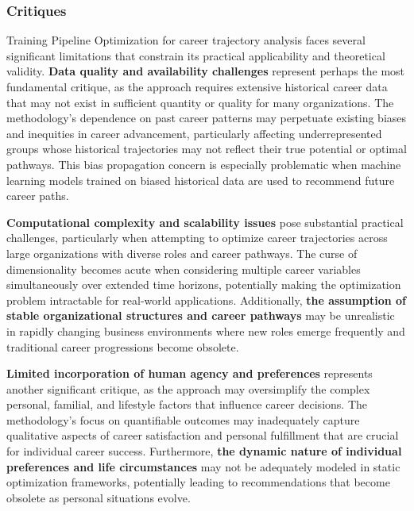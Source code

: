 \documentclass[main.tex]{subfiles}
\begin{document}
\subsubsection{Critiques}

Training Pipeline Optimization for career trajectory analysis faces several significant limitations that constrain its practical applicability and theoretical validity\parencite{career_optimization}. \textbf{Data quality and availability challenges} represent perhaps the most fundamental critique, as the approach requires extensive historical career data that may not exist in sufficient quantity or quality for many organizations\parencite{career_optimization}. The methodology's dependence on past career patterns may perpetuate existing biases and inequities in career advancement, particularly affecting underrepresented groups whose historical trajectories may not reflect their true potential or optimal pathways\parencite{career_optimization}. This bias propagation concern is especially problematic when machine learning models trained on biased historical data are used to recommend future career paths.

\textbf{Computational complexity and scalability issues} pose substantial practical challenges, particularly when attempting to optimize career trajectories across large organizations with diverse roles and career pathways\parencite{dynapipe_eurosys}. The curse of dimensionality becomes acute when considering multiple career variables simultaneously over extended time horizons, potentially making the optimization problem intractable for real-world applications\parencite{trajectory_dp}. Additionally, \textbf{the assumption of stable organizational structures and career pathways} may be unrealistic in rapidly changing business environments where new roles emerge frequently and traditional career progressions become obsolete\parencite{succession_pipelines}.

\textbf{Limited incorporation of human agency and preferences} represents another significant critique, as the approach may oversimplify the complex personal, familial, and lifestyle factors that influence career decisions\parencite{jobcomposer}. The methodology's focus on quantifiable outcomes may inadequately capture qualitative aspects of career satisfaction and personal fulfillment that are crucial for individual career success\parencite{career_optimization}. Furthermore, \textbf{the dynamic nature of individual preferences and life circumstances} may not be adequately modeled in static optimization frameworks, potentially leading to recommendations that become obsolete as personal situations evolve\parencite{succession_pipelines}.
\end{document}
